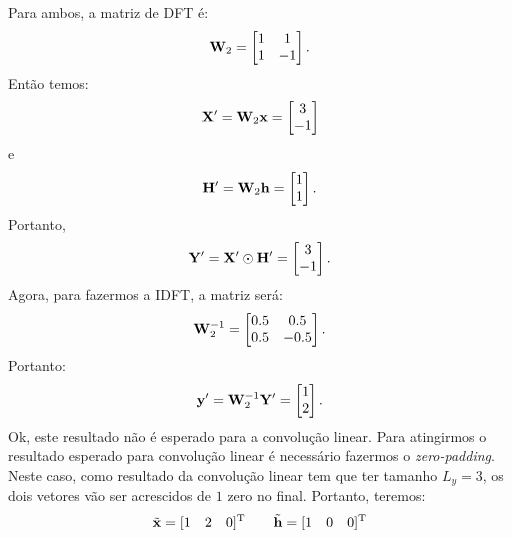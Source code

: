 \documentclass{homeworkclass}
\begin{document}
\begin{homeworkProblem}
	Para ambos, a matriz de DFT é: 
	\begin{equation*} \mathbf{W}_{2} = 
	\begin{bmatrix} 
	1 & 1 \\ 
	1 & -1
	\end{bmatrix}.
	\end{equation*}
	Então temos:
	\begin{equation*}
	\mathbf{X}^{\prime} = \mathbf{W}_{2}\mathbf{x} = 	\begin{bmatrix} 
	                        3 \\ 
	                        -1
	                        \end{bmatrix}
	\end{equation*}
	e
		\begin{equation*}
	\mathbf{H}^{\prime} = \mathbf{W}_{2}\mathbf{h} = 	\begin{bmatrix} 
									1 \\ 
									1
									\end{bmatrix}.
	\end{equation*}
	Portanto,
	\begin{equation*}
	\mathbf{Y}^{\prime} = \mathbf{X}^{\prime}\odot\mathbf{H}^{\prime} = \begin{bmatrix} 
	3 \\ 
	-1
	\end{bmatrix}.
	\end{equation*}
	Agora, para fazermos a IDFT, a matriz será:
	\begin{equation*} \mathbf{W}_{2}^{-1} = 
		\begin{bmatrix} 
	0.5 & 0.5 \\ 
	0.5 & -0.5
	\end{bmatrix}.
	\end{equation*}
	Portanto:
	\begin{equation*}
	\mathbf{y}^{\prime} = \mathbf{W}_{2}^{-1} \mathbf{Y}^{\prime} = \begin{bmatrix} 
													1 \\ 
													2
													\end{bmatrix}.
	\end{equation*}
	Ok, este resultado não é esperado para a convolução linear. Para atingirmos o resultado esperado para convolução linear é necessário fazermos o \textit{zero-padding}. Neste caso, como resultado da convolução linear tem que ter tamanho $L_{y} = 3$, os dois vetores vão ser acrescidos de $1$ zero no final. Portanto, teremos:
	\begin{equation*}
	\xbftil = [1 \quad 2 \quad 0]^{\Trm} \qquad
	\hbftil = [1 \quad 0 \quad 0]^{\Trm}

\end{equation*}
\end{homeworkProblem}
\end{document}
